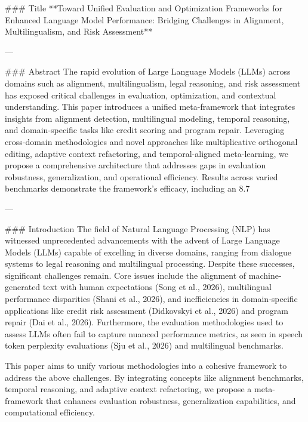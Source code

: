 ### Title
**Toward Unified Evaluation and Optimization Frameworks for Enhanced Language Model Performance: Bridging Challenges in Alignment, Multilingualism, and Risk Assessment**

---

### Abstract
The rapid evolution of Large Language Models (LLMs) across domains such as alignment, multilingualism, legal reasoning, and risk assessment has exposed critical challenges in evaluation, optimization, and contextual understanding. This paper introduces a unified meta-framework that integrates insights from alignment detection, multilingual modeling, temporal reasoning, and domain-specific tasks like credit scoring and program repair. Leveraging cross-domain methodologies and novel approaches like multiplicative orthogonal editing, adaptive context refactoring, and temporal-aligned meta-learning, we propose a comprehensive architecture that addresses gaps in evaluation robustness, generalization, and operational efficiency. Results across varied benchmarks demonstrate the framework's efficacy, including an 8.7%

---

### Introduction
The field of Natural Language Processing (NLP) has witnessed unprecedented advancements with the advent of Large Language Models (LLMs) capable of excelling in diverse domains, ranging from dialogue systems to legal reasoning and multilingual processing. Despite these successes, significant challenges remain. Core issues include the alignment of machine-generated text with human expectations (Song et al., 2026), multilingual performance disparities (Shani et al., 2026), and inefficiencies in domain-specific applications like credit risk assessment (Didkovskyi et al., 2026) and program repair (Dai et al., 2026). Furthermore, the evaluation methodologies used to assess LLMs often fail to capture nuanced performance metrics, as seen in speech token perplexity evaluations (Sju et al., 2026) and multilingual benchmarks.

This paper aims to unify various methodologies into a cohesive framework to address the above challenges. By integrating concepts like alignment benchmarks, temporal reasoning, and adaptive context refactoring, we propose a meta-framework that enhances evaluation robustness, generalization capabilities, and computational efficiency.

